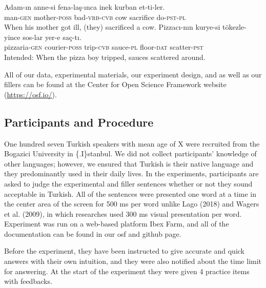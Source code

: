 \documentclass[11pt,a4paper]{article}
\begin{document}
\begin{exe}
\ex
\begin{xlist}
\ex \label{fillera}
\gll Adam-{\i}n anne-si fena-la\c{s}-{\i}nca inek kurban et-ti-ler.\\
man-\textsc{gen} mother-\textsc{poss} bad-\textsc{vrb}-\textsc{cvb} cow sacrifice do-\textsc{pst}-\textsc{pl}\\
\glt When his mother got ill, (they) sacrificed a cow.
\ex \label{fillerb}
\gll *Pizzac{\i}-n{\i}n kurye-si t\"{o}kezle-yince sos-lar yer-e sa\c{c}-t{\i}.\\
pizzaria-\textsc{gen} courier-\textsc{poss} trip-\textsc{cvb} sauce-\textsc{pl} floor-\textsc{dat} scatter-\textsc{pst}\\
\glt Intended: When the pizza boy tripped, sauces scattered around. 
\end{xlist}
\end{exe}

All of our data, experimental materials, our experiment design, and as
well as our fillers can be found at the Center for Open Science
Framework website (\url{https://osf.io/}).

\hypertarget{participants-and-procedure}{%
\subsection{Participants and
Procedure}\label{participants-and-procedure}}

One hundred seven Turkish speakers with mean age of X were recruited
from the Bogazici University in \{.I\}stanbul. We did not collect
participants' knowledge of other languages; however, we ensured that
Turkish is their native language and they predominantly used in their
daily lives. In the experiments, participants are asked to judge the
experimental and filler sentences whether or not they sound acceptable
in Turkish. All of the sentences were presented one word at a time in
the center area of the screen for 500 ms per word unlike Lago (2018) and
Wagers et al. (2009), in which researches used 300 ms visual
presentation per word. Experiment was run on a web-based platform Ibex
Farm, and all of the documentation can be found in our osf and github
page.

Before the experiment, they have been instructed to give accurate and
quick answers with their own intuition, and they were also notified
about the time limit for answering. At the start of the experiment they
were given 4 practice items with feedbacks.
\end{document}
